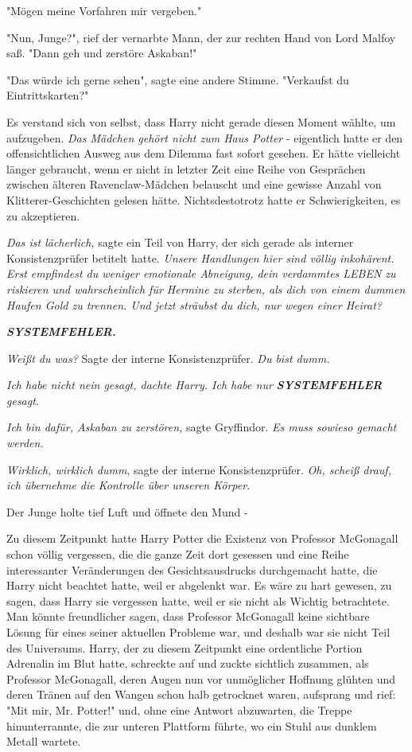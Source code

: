 {"Mögen meine Vorfahren mir vergeben."

"Nun, Junge?", rief der vernarbte Mann, der zur rechten Hand von Lord Malfoy saß. "Dann geh und zerstöre Askaban!"

"Das würde ich gerne sehen", sagte eine andere Stimme. "Verkaufst du Eintrittskarten?"

Es verstand sich von selbst, dass Harry nicht gerade diesen Moment wählte, um aufzugeben. \emph{Das Mädchen gehört nicht zum Haus Potter} - eigentlich hatte er den offensichtlichen Ausweg aus dem Dilemma fast sofort gesehen. Er hätte vielleicht länger gebraucht, wenn er nicht in letzter Zeit eine Reihe von Gesprächen zwischen älteren Ravenclaw-Mädchen belauscht und eine gewisse Anzahl von Klitterer-Geschichten gelesen hätte. Nichtsdestotrotz hatte er Schwierigkeiten, es zu akzeptieren.

\emph{Das ist lächerlich,} sagte ein Teil von Harry, der sich gerade als interner Konsistenzprüfer betitelt hatte. \emph{Unsere Handlungen hier sind völlig inkohärent. Erst empfindest du weniger emotionale Abneigung, dein verdammtes LEBEN zu riskieren und wahrscheinlich für Hermine zu sterben, als dich von einem dummen Haufen Gold zu trennen. Und jetzt sträubst du dich, nur wegen einer Heirat?}

\textbf{\emph{SYSTEMFEHLER.}}

\emph{Weißt du was?} Sagte der interne Konsistenzprüfer. \emph{Du bist dumm.}

\emph{Ich habe nicht nein gesagt, dachte Harry. Ich habe nur} \textbf{\emph{SYSTEMFEHLER}} \emph{gesagt.}

\emph{Ich bin dafür, Askaban zu zerstören,} sagte Gryffindor. \emph{Es muss sowieso gemacht werden.}

\emph{Wirklich, wirklich dumm}, sagte der interne Konsistenzprüfer. \emph{Oh, scheiß drauf, ich übernehme die Kontrolle über unseren Körper.}

Der Junge holte tief Luft und öffnete den Mund -

Zu diesem Zeitpunkt hatte Harry Potter die Existenz von Professor McGonagall schon völlig vergessen, die die ganze Zeit dort gesessen und eine Reihe interessanter Veränderungen des Gesichtsausdrucks durchgemacht hatte, die Harry nicht beachtet hatte, weil er abgelenkt war. Es wäre zu hart gewesen, zu sagen, dass Harry sie vergessen hatte, weil er sie nicht als Wichtig betrachtete. Man könnte freundlicher sagen, dass Professor McGonagall keine sichtbare Lösung für eines seiner aktuellen Probleme war, und deshalb war sie nicht Teil des Universums. Harry, der zu diesem Zeitpunkt eine ordentliche Portion Adrenalin im Blut hatte, schreckte auf und zuckte sichtlich zusammen, als Professor McGonagall, deren Augen nun vor unmöglicher Hoffnung glühten und deren Tränen auf den Wangen schon halb getrocknet waren, aufsprang und rief: "Mit mir, Mr. Potter!" und, ohne eine Antwort abzuwarten, die Treppe hinunterrannte, die zur unteren Plattform führte, wo ein Stuhl aus dunklem Metall wartete.

}
